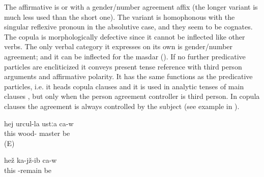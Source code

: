 The affirmative is  or  with a gender/number agreement affix (the longer variant is much less used than the short one). The variant  is homophonous with the singular reflexive pronoun in the absolutive case, and they seem to be cognates. The copula is morphologically defective since it cannot be inflected like other verbs. The only verbal category it expresses on its own is gender/number agreement; and it can be inflected for the masdar (). If no further predicative particles are encliticized it conveys present tense reference with third person arguments and affirmative polarity. It has the same functions as the predicative particles, i.e. it heads copula clauses  and it is used in analytic tenses of main clauses , but only when the person agreement controller is third person. In copula clauses the agreement is always controlled by the subject (see example  in ).
%
\begin{exe}
	\ex	\label{ex:He is a carpenter}
	\gll	hej	urcul-la	ustːa	ca-w\\
		this	wood-	master	be\\
	\glt	{} (E)

	\ex	\label{ex:He is sitting}
	\gll	hež	ka-jž-ib	ca-w\\
		this	-remain	be\\
	\glt	{}
\end{exe}

